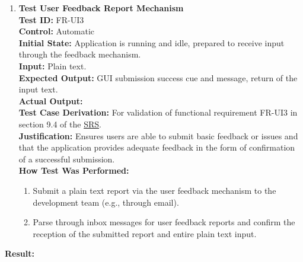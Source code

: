 \documentclass[12pt, titlepage]{article}
\begin{document}
\begin{enumerate}
    \item \textbf{Test User Feedback Report Mechanism} \\
      \newline
      \textbf{Test ID:} FR-UI3 \\
      \textbf{Control:} Automatic \\
      \textbf{Initial State:} Application is running and idle, prepared to receive input through the feedback mechanism. \\
      \textbf{Input:} Plain text. \\
      \textbf{Expected Output:} GUI submission success cue and message, return of the input text. \\
      \textbf{Actual Output:} \\
      \textbf{Test Case Derivation:} For validation of functional requirement FR-UI3 in section 9.4 of the 
      \href{https://github.com/emilyperica/ScoreGen/blob/main/docs/SRS-Volere/SRS.pdf}{SRS}. \\
      \textbf{Justification:} Ensures users are able to submit basic feedback or issues and that the application provides adequate
      feedback in the form of confirmation of a successful submission.\\
      \textbf{How Test Was Performed:}
      \begin{enumerate}
          \item Submit a plain text report via the user feedback mechanism to the development team (e.g., through email).
          \item Parse through inbox messages for user feedback reports and confirm the reception of the submitted report and 
          entire plain text input.
      \end{enumerate}
  \end{enumerate}
  \textbf{Result:}
\end{document}
